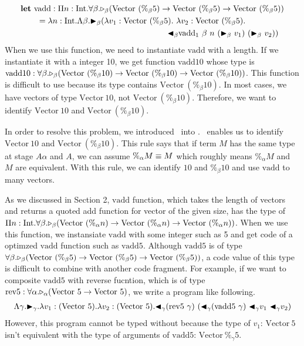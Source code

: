 \begin{align*}
	  & \textbf{let}\ \text{vadd}: \Pi n:\I.\F\beta.\TW_\beta(\Vpn\to\Vpn\to\Vpn)                \\ 
	  & \hspace{7mm} = \lambda n:\I.\Lambda\beta.\TB_\beta (\lambda v_1:\Vpn.\ \lambda v_2:\Vpn. \\
	  & \hspace{63mm} \TBL_\beta \text{vadd}_1\ \beta\ n\ (\TB_\beta\ v_1)\ (\TB_\beta\ v_2))    \\
\end{align*}
\renewcommand{\Vpn}{\text{Vector}\ (\%_\beta 10)}
When we use this function, we need to instantiate $\text{vadd}$ with a length.
If we instantiate it with a integer 10, we get function $\text{vadd10}$ whose type is \\
$\text{vadd10}: \F\beta.\TW_\beta(\Vpn\to\Vpn\to\Vpn)$.
This function is difficult to use because its type contains $\Vpn$.
In most cases, we have vectors of type $\text{Vector}\ 10$, not $\Vpn$.
Therefore, we want to identify $\text{Vector}\ 10$ and $\Vpn$.

In order to resolve this problem, we introduced \QPercent\ into \LMD.
\QPercent\ enables us to identify $\text{Vector}\ 10$ and $\Vpn$.
This rule says that if term $M$ has the same type at stage $A\alpha$ and $A$,
we can assume $\%_\alpha M \equiv M$ which roughly means $\%_\alpha M$ and $M$ are equivalent.
With this rule, we can identify $10$ and $\%_\beta 10$ and use $\text{vadd}$ to many vectors.
\begin{center}
\end{center}



\renewcommand{\Vpn}{\text{Vector}\ (\%_\alpha n)}
As we discussed in Section 2, $\text{vadd}$ function,
which takes the length of vectors and returns a quoted add function for vector of the given size,
has the type of $\Pi n:\I.\F\beta.\TW_\beta(\Vpn\to\Vpn\to\Vpn)$.
When we use this function, we instansiate $\text{vadd}$ with some integer such as 5
and get code of a optimzed $\text{vadd}$ function such as $\text{vadd5}$.
\renewcommand{\Vpn}{\text{Vector}\ (\%_\beta 5)}
Although $\text{vadd5}$ is of type $\F\beta.\TW_\beta(\Vpn\to\Vpn\to\Vpn)$,
a code value of this type is difficult to combine with another code fragment.
For example, if we want to composite $\text{vadd5}$ with reverse fucntion,
which is of type $\text{rev5}:\forall\alpha.{\mathop{\triangleright}}_\alpha(\text{Vector}\ 5\to\text{Vector}\ 5)$,
we write a program like following.
\begin{align*}
  \Lambda\gamma.{\mathop{\blacktriangleright}}_\gamma.\lambda v_1:(\text{Vector}\ 5).\lambda v_2:(\text{Vector}\ 5).{\mathop{\blacktriangleleft}}_\gamma
  (\text{rev5}\ \gamma)\ ({\mathop{\blacktriangleleft}}_\gamma (\text{vadd5}\ \gamma)\ {\mathop{\blacktriangleleft}}_\gamma v_1\ {\mathop{\blacktriangleleft}}_\gamma v_2)
\end{align*}
However, this program cannot be typed without \QPercent{}
because the type of $v_1$: $\text{Vector}\ 5$ isn't equivalent with the type of arguments of $\text{vadd5}$: $\text{Vector}\ \%_\gamma 5$.

